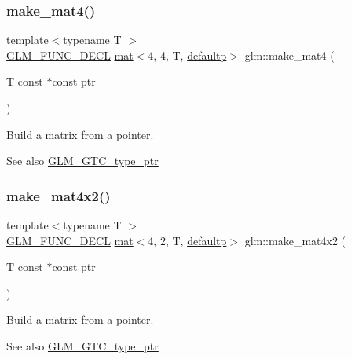 \subsubsection{\texorpdfstring{make\+\_\+mat4()}{make\_mat4()}}
{\footnotesize\ttfamily template$<$typename T $>$ \\
\mbox{\hyperlink{setup_8hpp_ab2d052de21a70539923e9bcbf6e83a51}{G\+L\+M\+\_\+\+F\+U\+N\+C\+\_\+\+D\+E\+CL}} \mbox{\hyperlink{structglm_1_1mat}{mat}}$<$4, 4, T, \mbox{\hyperlink{namespaceglm_a36ed105b07c7746804d7fdc7cc90ff25a9d21ccd8b5a009ec7eb7677befc3bf51}{defaultp}}$>$ glm\+::make\+\_\+mat4 (\begin{DoxyParamCaption}\item[{T const $\ast$const}]{ptr }\end{DoxyParamCaption})}

Build a matrix from a pointer. \begin{DoxySeeAlso}{See also}
\mbox{\hyperlink{group__gtc__type__ptr}{G\+L\+M\+\_\+\+G\+T\+C\+\_\+type\+\_\+ptr}} 
\end{DoxySeeAlso}
\mbox{\label{group__gtc__type__ptr_ga8b34c9b25bf3310d8ff9c828c7e2d97c}} 
\subsubsection{\texorpdfstring{make\+\_\+mat4x2()}{make\_mat4x2()}}
{\footnotesize\ttfamily template$<$typename T $>$ \\
\mbox{\hyperlink{setup_8hpp_ab2d052de21a70539923e9bcbf6e83a51}{G\+L\+M\+\_\+\+F\+U\+N\+C\+\_\+\+D\+E\+CL}} \mbox{\hyperlink{structglm_1_1mat}{mat}}$<$4, 2, T, \mbox{\hyperlink{namespaceglm_a36ed105b07c7746804d7fdc7cc90ff25a9d21ccd8b5a009ec7eb7677befc3bf51}{defaultp}}$>$ glm\+::make\+\_\+mat4x2 (\begin{DoxyParamCaption}\item[{T const $\ast$const}]{ptr }\end{DoxyParamCaption})}

Build a matrix from a pointer. \begin{DoxySeeAlso}{See also}
\mbox{\hyperlink{group__gtc__type__ptr}{G\+L\+M\+\_\+\+G\+T\+C\+\_\+type\+\_\+ptr}} 
\end{DoxySeeAlso}
\mbox{\label{group__gtc__type__ptr_ga0330bf6640092d7985fac92927bbd42b}} 
